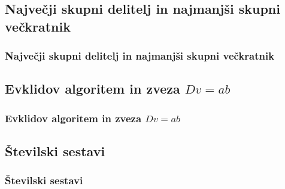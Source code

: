     \subsection{Največji skupni delitelj in najmanjši skupni večkratnik}

        \begin{frame}
            \frametitle{Največji skupni delitelj in najmanjši skupni večkratnik}
        \end{frame}


    \subsection{Evklidov algoritem in zveza $D v=ab$}

        \begin{frame}
            \frametitle{Evklidov algoritem in zveza $Dv=ab$}
        \end{frame}

    \subsection{Številski sestavi}

        \begin{frame}
            \frametitle{Številski sestavi}
        \end{frame}

